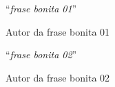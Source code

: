 \vfill
\begin{flushright}

``\textit{frase bonita 01}''\\

\vspace{0.4cm}

Autor da frase bonita 01

\end{flushright}

\vspace{0.5cm}

\begin{flushright}

``\textit{frase bonita 02}''\\

\vspace{0.4cm}

Autor da frase bonita 02

\end{flushright}

\vspace{2cm}